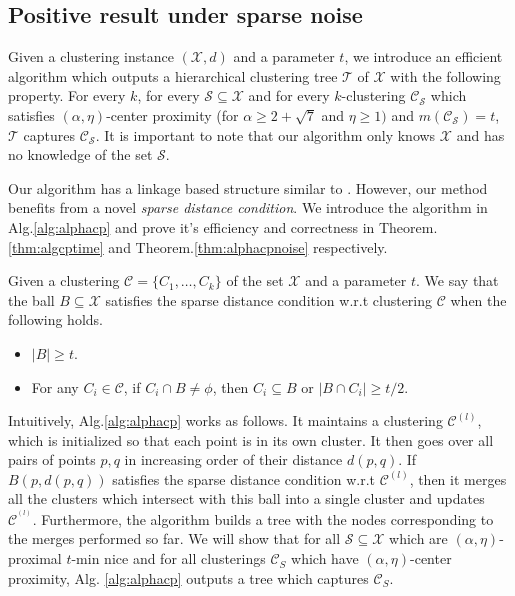 \documentclass[anon,12pt]{colt2016} %
\newcommand{\mc}{\mathcal}
\begin{document}



\subsection{Positive result under sparse noise}
\label{section:positiveResultSparseNoise}

Given a clustering instance $(\mc X, d)$ and a parameter $t$, we introduce an efficient algorithm which outputs a hierarchical clustering tree $\mc T$ of $\mc X$ with the following property. For every $k$, for every $\mc S \subseteq \mc X$ and for every $k$-clustering $\mc C_{\mc S}$ which satisfies $(\alpha, \eta)$-center proximity (for $\alpha \ge 2 + \sqrt{7}$ and $ \eta \ge 1)$ and $m(\mc C_{\mc S}) = t$, $\mc T$ captures $\mc C_{\mc S}$. It is important to note that our algorithm only knows $\mc X$ and has no knowledge of the set $\mc S$.


Our algorithm has a linkage based structure similar to \cite{balcan2012clustering}. However, our method benefits from a novel {\it sparse distance condition}. We introduce the algorithm in Alg.\ref{alg:alphacp} and prove it's efficiency and correctness in Theorem. \ref{thm:algcptime} and Theorem.\ref{thm:alphacpnoise} respectively. 

\begin{definition}
	 Given a clustering $\mc C = \{C_1,\ldots,C_k\}$ of the set $\mc X$ and a parameter $t$. We say that the ball $B \subseteq \mc X$ satisfies the sparse distance condition w.r.t clustering $\mc C$ when the following holds.
\begin{itemize}[noitemsep, leftmargin=*]
\item $|B| \ge t$.
\item For any $C_i \in \mc C$, if $C_i \cap B \neq \phi$, then $C_i \subseteq B$ or $|B \cap C_i| \ge t/2$.
\end{itemize}
\end{definition}

Intuitively, Alg.\ref{alg:alphacp} works as follows. It maintains a clustering $\mc C^{(l)}$, which is initialized so that each point is in its own cluster. It then goes over all pairs of points $p, q$ in increasing order of their distance $d(p, q)$. If $B(p, d(p,q))$ satisfies the sparse distance condition w.r.t $\mc C^{(l)}$, then it merges all the clusters which intersect with this ball into a single cluster and updates $\mc C^{^(l)}$. Furthermore, the algorithm builds a tree with the nodes corresponding to the merges performed so far. We will show that for all $\mc S \subseteq \mc X$ which are $(\alpha, \eta)$-proximal $t$-min nice and for all clusterings $\mc C_S$ which have $(\alpha, \eta)$-center proximity, Alg. \ref{alg:alphacp} outputs a tree which captures $\mc C_S$.
\end{document}
